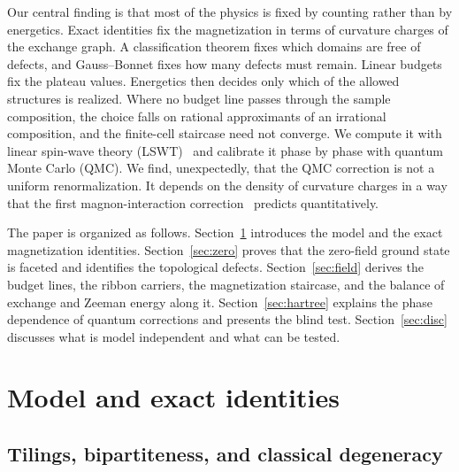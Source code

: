 \documentclass[aps,prb,twocolumn,superscriptaddress,floatfix]{revtex4-2}
\begin{document}
Our central finding is that most of the physics is fixed by counting rather than by energetics. Exact identities fix the magnetization in terms of curvature charges of the exchange graph. A classification theorem fixes which domains are free of defects, and Gauss--Bonnet fixes how many defects must remain. Linear budgets fix the plateau values. Energetics then decides only which of the allowed structures is realized. Where no budget line passes through the sample composition, the choice falls on rational approximants of an irrational composition, and the finite-cell staircase need not converge. We compute it with linear spin-wave theory (LSWT)~\cite{Anderson1952} and calibrate it phase by phase with quantum Monte Carlo (QMC). We find, unexpectedly, that the QMC correction is not a uniform renormalization. It depends on the density of curvature charges in a way that the first magnon-interaction correction~\cite{Oguchi1960} predicts quantitatively.

The paper is organized as follows. Section~\ref{sec:model} introduces the model and the exact magnetization identities. Section~\ref{sec:zero} proves that the zero-field ground state is faceted and identifies the topological defects. Section~\ref{sec:field} derives the budget lines, the ribbon carriers, the magnetization staircase, and the balance of exchange and Zeeman energy along it. Section~\ref{sec:hartree} explains the phase dependence of quantum corrections and presents the blind test. Section~\ref{sec:disc} discusses what is model independent and what can be tested.

\section{Model and exact identities}\label{sec:model}

\subsection{Tilings, bipartiteness, and classical degeneracy}
\end{document}
